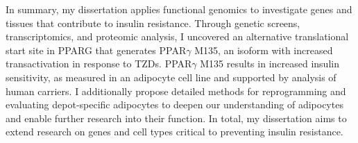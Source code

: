 \begin{dissertationintroduction}
In summary, my dissertation applies functional genomics to investigate genes and tissues that contribute to insulin resistance. Through genetic screens, transcriptomics, and proteomic analysis, I uncovered an alternative translational start site in PPARG that generates PPAR$\gamma$ M135, an isoform with increased transactivation in response to TZDs. PPAR$\gamma$ M135 results in increased insulin sensitivity, as measured in an adipocyte cell line and supported by analysis of human carriers. I additionally propose detailed methods for reprogramming and evaluating depot-specific adipocytes to deepen our understanding of adipocytes and enable further research into their function. In total, my dissertation aims to extend research on genes and cell types critical to preventing insulin resistance.

\end{dissertationintroduction}



